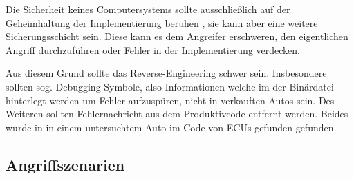 Die Sicherheit keines Computersystems sollte ausschließlich auf der
Geheimhaltung der Implementierung beruhen \cite{ServerSecurity2008}, sie kann
aber eine weitere Sicherungsschicht sein. Diese kann es dem Angreifer
erschweren, den eigentlichen Angriff durchzuführen oder Fehler in der
Implementierung verdecken.

Aus diesem Grund sollte das Reverse-Engineering schwer sein. Insbesondere
sollten sog. Debugging-Symbole, also Informationen welche im der Binärdatei
hinterlegt werden um Fehler aufzuspüren, nicht in verkauften Autos sein. Des
Weiteren sollten Fehlernachricht aus dem Produktivcode entfernt werden. Beides
wurde in \cite{Checkoway2011} in einem untersuchtem Auto im Code von ECUs
gefunden gefunden.


\subsection{Angriffszenarien}